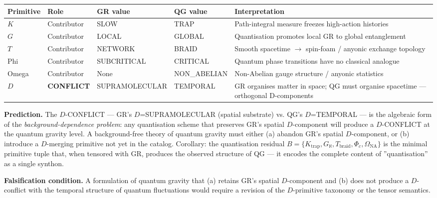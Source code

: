 \documentclass[12pt,a4paper]{article}
\begin{document}
\begin{table}[htbp]
\centering
\small
{}
\begin{tabularx}{\textwidth}{>{\centering\arraybackslash}X >{\centering\arraybackslash}X >{\centering\arraybackslash}X >{\centering\arraybackslash}X >{\centering\arraybackslash}X}
\toprule
\rowcolor{gray!25}\textbf{Primitive} & \textbf{Role} & \textbf{GR value} & \textbf{QG value} & \textbf{Interpretation} \\
\midrule
\rowcolors{1}{white}{gray!10}
$K$ & Contributor & SLOW & TRAP & Path-integral measure freezes high-action histories \\
$G$ & Contributor & LOCAL & GLOBAL & Quantisation promotes local GR to global entanglement \\
$T$ & Contributor & NETWORK & BRAID & Smooth spacetime $\rightarrow$ spin-foam / anyonic exchange topology \\
Phi & Contributor & SUBCRITICAL & CRITICAL & Quantum phase transitions have no classical analogue \\
Omega & Contributor & None & NON\_ABELIAN & Non-Abelian gauge structure / anyonic statistics \\
$D$ & \textbf{CONFLICT} & SUPRAMOLECULAR & TEMPORAL & GR organises matter in space; QG must organise spacetime --- orthogonal D-components \\
\bottomrule
\end{tabularx}
\end{table}

\textbf{Prediction.} The $D$-CONFLICT --- GR's $D$=SUPRAMOLECULAR (spatial substrate) vs. QG's $D$=TEMPORAL --- is the algebraic form of the \emph{background-dependence problem}: any quantisation scheme that preserves GR's spatial $D$-component will produce a $D$-CONFLICT at the quantum gravity level. A background-free theory of quantum gravity must either (a) abandon GR's spatial $D$-component, or (b) introduce a $D$-merging primitive not yet in the catalog. Corollary: the quantisation residual $B = \{K_\text{trap}, G_\aleph, T_\text{braid}, \Phi_c, \Omega_\text{NA}\}$ is the minimal primitive tuple that, when tensored with GR, produces the observed structure of QG --- it encodes the complete content of ''quantisation'' as a single synthon.

\textbf{Falsification condition.} A formulation of quantum gravity that (a) retains GR's spatial $D$-component and (b) does not produce a $D$-conflict with the temporal structure of quantum fluctuations would require a revision of the $D$-primitive taxonomy or the tensor semantics.
\end{document}
